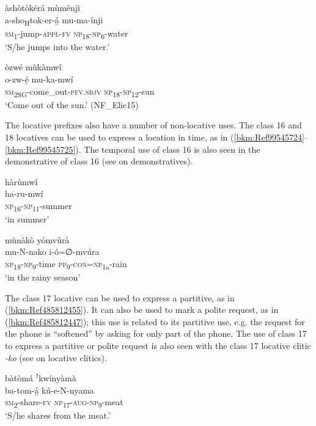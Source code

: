 \ea
\label{bkm:Ref492028406}
àshòtòkérá mùmênjì\\
\gll a-sho\textsubscript{H}tok-er-á̲  mu-ma-ínji\\
\textsc{sm}\textsubscript{1}-jump-\textsc{appl}-\textsc{fv}  \textsc{np}\textsubscript{18}-\textsc{np}\textsubscript{6}-water\\
\glt ‘S/he jumps into the water.’
\z

\ea
\label{bkm:Ref492028408}
òzwé mùkàmwî\\
\gll o-zw-é̲      mu-ka-mwí\\
\textsc{sm}\textsubscript{2SG}-come\_out-\textsc{pfv}.\textsc{sbjv}  \textsc{np}\textsubscript{18}-\textsc{np}\textsubscript{12}-sun\\
\glt ‘Come out of the sun.’ (NF\_Elic15)
\z

The locative prefixes also have a number of non-locative uses. The class 16 and 18 locatives can be used to express a location in time, as in (\ref{bkm:Ref99545724}--\ref{bkm:Ref99545725}). The temporal use of class 16 is also seen in the demonstrative of class 16 (see  on demonstratives).

\ea
\label{bkm:Ref99545724}
\glll hàrùmwî\\
ha-ru-mwí\\
\textsc{np}\textsubscript{16}-\textsc{np}\textsubscript{11}-summer\\
\glt ‘in summer’
\z

\ea
\label{bkm:Ref99545725}
mùnàkò yómvûrà\\
\gll mu-N-nako    i-ó=∅-mvúra\\
\textsc{np}\textsubscript{18}-\textsc{np}\textsubscript{9}-time  \textsc{pp}\textsubscript{9}-\textsc{con}=\textsc{np}\textsubscript{1a}-rain\\
\glt ‘in the rainy season’
\z

The class 17 locative can be used to express a partitive, as in (\ref{bkm:Ref485812455}). It can also be used to mark a polite request, as in (\ref{bkm:Ref485812447}); this use is related to its partitive use, e.g. the request for the phone is “softened” by asking for only part of the phone. The use of class 17 to express a partitive or polite request is also seen with the class 17 locative clitic \textit{-ko} (see  on locative clitics).

\ea
\label{bkm:Ref485812455}
bàtòmá ꜝkwínyàmà\\
\gll ba-tom-á̲  kú-e-N-nyama\\
\textsc{sm}\textsubscript{2}-share-\textsc{fv}  \textsc{np}\textsubscript{17}-\textsc{aug}-\textsc{np}\textsubscript{9}-meat\\
\glt ‘S/he shares from the meat.’
\z

